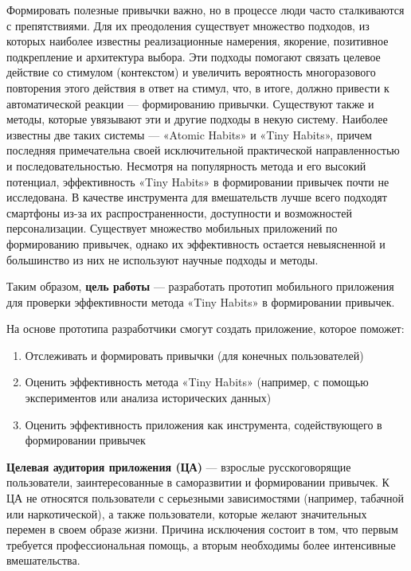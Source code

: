 \documentclass[pdflatex,sn-mathphys-num]{sn-jnl}%
\theoremstyle{thmstyleone}%
\theoremstyle{thmstyletwo}%
\theoremstyle{thmstylethree}%
\begin{document}
Формировать полезные привычки важно, но в процессе люди часто сталкиваются с препятствиями. Для их преодоления существует множество подходов, из которых наиболее известны реализационные намерения, якорение, позитивное подкрепление и архитектура выбора. Эти подходы помогают связать целевое действие со стимулом (контекстом) и увеличить вероятность многоразового повторения этого действия в ответ на стимул, что, в итоге, должно привести к автоматической реакции — формированию привычки. Существуют также и методы, которые увязывают эти и другие подходы в некую систему. Наиболее известны две таких системы — «Atomic Habits» и «Tiny Habits», причем последняя примечательна своей исключительной практической направленностью и последовательностью. Несмотря на популярность метода и его высокий потенциал, эффективность «Tiny Habits» в формировании привычек почти не исследована. В качестве инструмента для вмешательств лучше всего подходят смартфоны из-за их распространенности, доступности и возможностей персонализации. Существует множество мобильных приложений по формированию привычек, однако их эффективность остается невыясненной и большинство из них не используют научные подходы и методы.

Таким образом, \textbf{цель работы} — разработать прототип мобильного приложения для проверки эффективности метода «Tiny Habits» в формировании привычек.

На основе прототипа разработчики смогут создать приложение, которое поможет:

\begin{enumerate}
    \item Отслеживать и формировать привычки (для конечных пользователей)
    \item Оценить эффективность метода «Tiny Habits» (например, с помощью экспериментов или анализа исторических данных)
    \item Оценить эффективность приложения как инструмента, содействующего в формировании привычек
\end{enumerate}

\textbf{Целевая аудитория приложения (ЦА)} — взрослые русскоговорящие пользователи, заинтересованные в саморазвитии и формировании привычек. К ЦА не относятся пользователи с серьезными зависимостями (например, табачной или наркотической), а также пользователи, которые желают значительных перемен в своем образе жизни. Причина исключения состоит в том, что первым требуется профессиональная помощь, а вторым необходимы более интенсивные вмешательства.
\end{document}
